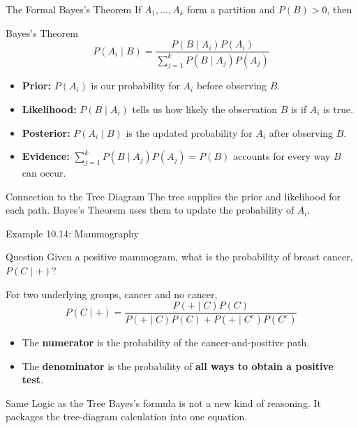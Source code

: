 \documentclass[aspectratio=169]{beamer}
\begin{document}

\begin{frame}{The Formal Bayes's Theorem}
If $A_1,\ldots,A_k$ form a partition and $P(B)>0$, then

\begin{block}{Bayes's Theorem}
$$P(A_i\mid B)=\frac{P(B\mid A_i)P(A_i)}{\sum_{j=1}^{k}P(B\mid A_j)P(A_j)}$$
\end{block}

\begin{itemize}
	\item \textbf{Prior:} $P(A_i)$ is our probability for $A_i$ before observing $B$.
	\item \textbf{Likelihood:} $P(B\mid A_i)$ tells us how likely the observation $B$ is if $A_i$ is true.
	\item \textbf{Posterior:} $P(A_i\mid B)$ is the updated probability for $A_i$ after observing $B$.
	\item \textbf{Evidence:} $\sum_{j=1}^{k}P(B\mid A_j)P(A_j)=P(B)$ accounts for every way $B$ can occur.
\end{itemize}

\begin{block}{Connection to the Tree Diagram}
The tree supplies the prior and likelihood for each path. Bayes's Theorem uses them to update the probability of $A_i$.
\end{block}
\end{frame}

\begin{frame}{Example 10.14: Mammography}
\begin{block}{Question}
Given a positive mammogram, what is the probability of breast cancer, $P(C\mid +)$?
\end{block}
For two underlying groups, cancer and no cancer,
$$P(C\mid +)=\frac{P(+\mid C)P(C)}{P(+\mid C)P(C)+P(+\mid C^c)P(C^c)}$$

\begin{itemize}
	\item The \textbf{numerator} is the probability of the cancer-and-positive path.
	\item The \textbf{denominator} is the probability of \textbf{all ways to obtain a positive test}.
\end{itemize}

\begin{block}{Same Logic as the Tree}
Bayes's formula is not a new kind of reasoning. It packages the tree-diagram calculation into one equation.
\end{block}
\end{frame}
\end{document}
